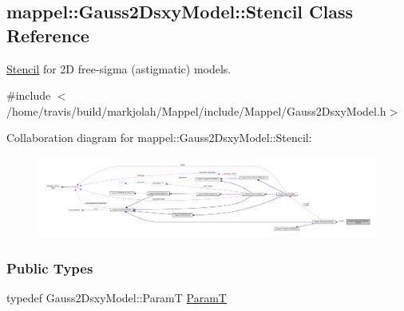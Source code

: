 \hypertarget{classmappel_1_1Gauss2DsxyModel_1_1Stencil}{}\subsection{mappel\+:\+:Gauss2\+Dsxy\+Model\+:\+:Stencil Class Reference}
\label{classmappel_1_1Gauss2DsxyModel_1_1Stencil}


\hyperlink{classmappel_1_1Gauss2DsxyModel_1_1Stencil}{Stencil} for 2D free-\/sigma (astigmatic) models.  




{\ttfamily \#include $<$/home/travis/build/markjolah/\+Mappel/include/\+Mappel/\+Gauss2\+Dsxy\+Model.\+h$>$}



Collaboration diagram for mappel\+:\+:Gauss2\+Dsxy\+Model\+:\+:Stencil\+:\nopagebreak
\begin{figure}[H]
\begin{center}
\leavevmode
\includegraphics[width=350pt]{classmappel_1_1Gauss2DsxyModel_1_1Stencil__coll__graph}
\end{center}
\end{figure}
\subsubsection*{Public Types}
\begin{DoxyCompactItemize}
\item 
typedef Gauss2\+Dsxy\+Model\+::\+ParamT \hyperlink{classmappel_1_1Gauss2DsxyModel_1_1Stencil_a73f8f8811eb4ea2e45476a45e188c06d}{ParamT}
\end{DoxyCompactItemize}
